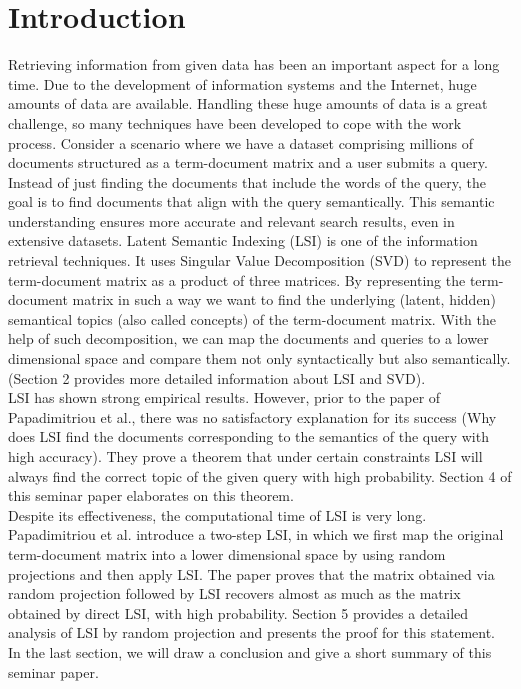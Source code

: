 \documentclass[a4paper,11pt,DIV=15]{scrartcl} %
\theoremstyle{plain}
\theoremstyle{definition}
\begin{document}
\clearpage


\section{Introduction} %
Retrieving information from given data has been an important aspect for a long time.
Due to the development of information systems and the Internet, huge amounts of data are available. 
Handling these huge amounts of data is a great challenge, so many techniques have been developed to cope with the work process. 
Consider a scenario where we have a dataset comprising millions of documents structured as a term-document matrix and a user submits a query. Instead of just finding the documents that include the words of the query, the goal is to find documents that align with the query semantically. This semantic understanding ensures more accurate and relevant search results, even in extensive datasets.
Latent Semantic Indexing (LSI) is one of the information retrieval techniques. It uses Singular Value Decomposition (SVD) to represent the term-document matrix as a product of three matrices. By representing the term-document matrix in such a way we want to find the underlying (latent, hidden) semantical topics (also called concepts) of the term-document matrix. With the help of such decomposition, we can map the documents and queries to a lower dimensional space and compare them not only syntactically but also semantically. (Section 2 provides more detailed information about LSI and SVD).\\
LSI has shown strong empirical results. However, prior to the paper of Papadimitriou et al., there was no satisfactory explanation for its success (Why does LSI find the documents corresponding to the semantics of the query with high accuracy). They prove a theorem that under certain constraints LSI will always find the correct topic of the given query with high probability. Section 4 of this seminar paper elaborates on this theorem.\\
Despite its effectiveness, the computational time of LSI is very long. Papadimitriou et al. introduce a two-step LSI, in which we first map the original term-document matrix into a lower dimensional space by using random projections and then apply LSI. The paper proves that the matrix obtained via random projection followed by LSI recovers almost as much as the matrix obtained by direct LSI, with high probability. Section 5 provides a detailed analysis of LSI by random projection and presents the proof for this statement.\\
In the last section, we will draw a conclusion and give a short summary of this seminar paper.
\end{document}
